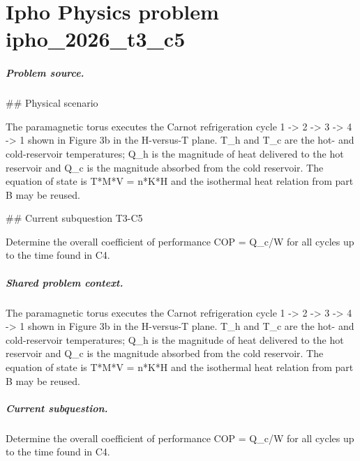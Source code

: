 
\chapter{Ipho Physics problem ipho\_2026\_t3\_c5}
\label{ch:IPhO2026Problems_problem_ipho_2026_t3_c5}

\paragraph{Problem source.}
\#\# Physical scenario

The paramagnetic torus executes the Carnot refrigeration cycle
1 -> 2 -> 3 -> 4 -> 1 shown in Figure 3b in the H-versus-T plane.  T\_h and T\_c
are the hot- and cold-reservoir temperatures; Q\_h is the magnitude of heat
delivered to the hot reservoir and Q\_c is the magnitude absorbed from the cold
reservoir.  The equation of state is T*M*V = n*K*H and the isothermal heat
relation from part B may be reused.

\#\# Current subquestion T3-C5

Determine the overall coefficient of performance COP = Q\_c/W for all cycles up to the time found in C4.

\paragraph{Shared problem context.}
The paramagnetic torus executes the Carnot refrigeration cycle
1 -> 2 -> 3 -> 4 -> 1 shown in Figure 3b in the H-versus-T plane.  T\_h and T\_c
are the hot- and cold-reservoir temperatures; Q\_h is the magnitude of heat
delivered to the hot reservoir and Q\_c is the magnitude absorbed from the cold
reservoir.  The equation of state is T*M*V = n*K*H and the isothermal heat
relation from part B may be reused.

\paragraph{Current subquestion.}
Determine the overall coefficient of performance COP = Q\_c/W for all cycles up to the time found in C4.

